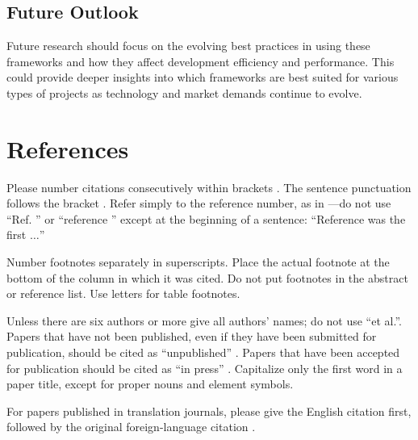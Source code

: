 \documentclass[conference]{IEEEtran}
\begin{document}
\subsection{Future Outlook}
Future research should focus on the evolving best practices in using these frameworks and how they affect development efficiency and performance. This could provide deeper insights into which frameworks are best suited for various types of projects as technology and market demands continue to evolve.

\section*{References}

Please number citations consecutively within brackets \cite{b1}. The 
sentence punctuation follows the bracket \cite{b2}. Refer simply to the reference 
number, as in \cite{b3}---do not use ``Ref. \cite{b3}'' or ``reference \cite{b3}'' except at 
the beginning of a sentence: ``Reference \cite{b3} was the first $\ldots$''

Number footnotes separately in superscripts. Place the actual footnote at 
the bottom of the column in which it was cited. Do not put footnotes in the 
abstract or reference list. Use letters for table footnotes.

Unless there are six authors or more give all authors' names; do not use 
``et al.''. Papers that have not been published, even if they have been 
submitted for publication, should be cited as ``unpublished'' \cite{b4}. Papers 
that have been accepted for publication should be cited as ``in press'' \cite{b5}. 
Capitalize only the first word in a paper title, except for proper nouns and 
element symbols.

For papers published in translation journals, please give the English 
citation first, followed by the original foreign-language citation \cite{b6}.
\end{document}

